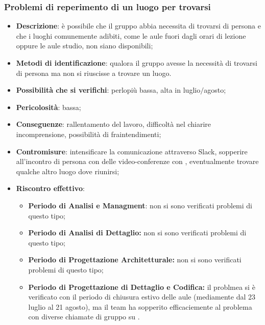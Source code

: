       \subsubsection{Problemi di reperimento di un luogo per trovarsi}
		\begin{itemize}
			\item \textbf{Descrizione}: è possibile che il gruppo abbia necessita di trovarsi di persona e che i luoghi comunemente adibiti, come le aule fuori dagli orari di lezione oppure le aule studio, non siano disponibili;
			\item \textbf{Metodi di identificazione}: qualora il gruppo avesse la necessità di trovarsi di persona ma non si riuscisse a trovare un luogo.
			\item \textbf{Possibilità che si verifichi}: perlopiù bassa, alta in luglio$/$agosto;
			\item \textbf{Pericolosità}: bassa;
			\item \textbf{Conseguenze}: rallentamento del lavoro, difficoltà nel chiarire incomprensione, possibilità di fraintendimenti;
			\item \textbf{Contromisure}: intensificare la comunicazione attraverso Slack, sopperire all'incontro di persona con delle video-conferenze con , eventualmente trovare qualche altro luogo dove riunirsi;
			\item \textbf{Riscontro effettivo}:
			\begin{itemize}
				\item \textbf{Periodo di Analisi e Managment}: non si sono verificati problemi di questo tipo;
				\item \textbf{Periodo di Analisi di Dettaglio:} non si sono verificati problemi di questo tipo;
				\item \textbf{Periodo di Progettazione Architetturale:} non si sono verificati problemi di questo tipo;
            \item \textbf{Periodo di Progettazione di Dettaglio e Codifica:} il problmea si è verificato con il periodo di chiusura estivo delle aule (mediamente dal 23 luglio al 21 agosto), ma il team ha sopperito efficaciemente al problema con diverse chiamate di gruppo su .
			\end{itemize}
		\end{itemize}
